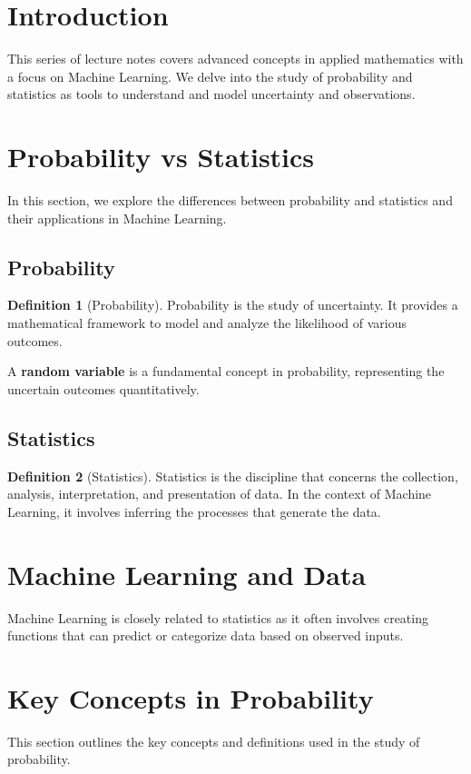 \documentclass[12pt,openany]{book}
\theoremstyle{definition}
\newtheorem{definition}{Definition}[chapter]
\begin{document}
	\newpage
	\section{Introduction}
	This series of lecture notes covers advanced concepts in applied mathematics with a focus on Machine Learning. We delve into the study of probability and statistics as tools to understand and model uncertainty and observations.
	
	\section{Probability vs Statistics}
	In this section, we explore the differences between probability and statistics and their applications in Machine Learning.
	
	\subsection{Probability}
	\begin{definition}[Probability]
		Probability is the study of uncertainty. It provides a mathematical framework to model and analyze the likelihood of various outcomes.
	\end{definition}
	
	A \textbf{random variable} is a fundamental concept in probability, representing the uncertain outcomes quantitatively.
	
	\subsection{Statistics}
	\begin{definition}[Statistics]
		Statistics is the discipline that concerns the collection, analysis, interpretation, and presentation of data. In the context of Machine Learning, it involves inferring the processes that generate the data.
	\end{definition}
	
	\section{Machine Learning and Data}
	Machine Learning is closely related to statistics as it often involves creating functions that can predict or categorize data based on observed inputs.
	
	\section{Key Concepts in Probability}
	This section outlines the key concepts and definitions used in the study of probability.
	
\end{document}

